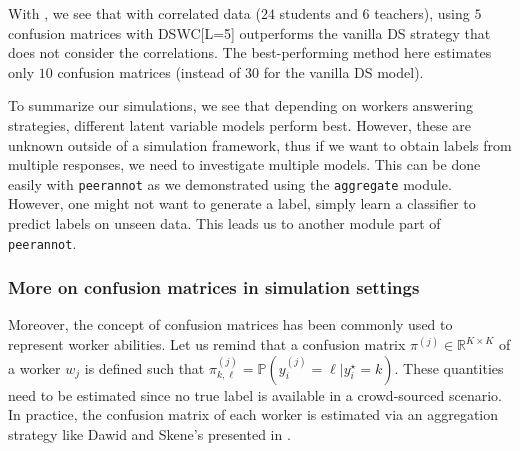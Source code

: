 With , we see that with correlated data ($24$ students and $6$ teachers), using $5$ confusion matrices with DSWC[L=5] outperforms the vanilla DS strategy that does not consider the correlations.
The best-performing method here estimates only $10$ confusion matrices (instead of $30$ for the vanilla DS model).

To summarize our simulations, we see that depending on workers answering strategies, different latent variable models perform best.
However, these are unknown outside of a simulation framework, thus if we want to obtain labels from multiple responses, we need to investigate multiple models.
This can be done easily with \texttt{peerannot} as we demonstrated using the \texttt{aggregate} module.
However, one might not want to generate a label, simply learn a classifier to predict labels on unseen data. This leads us to another module part of \texttt{peerannot}.

\subsubsection{More on confusion matrices in simulation settings}

Moreover, the concept of confusion matrices has been commonly used to represent worker abilities.
Let us remind that a confusion matrix $\pi^{(j)}\in\mathbb{R}^{K\times K}$ of a worker $w_j$ is defined such that $\pi^{(j)}_{k,\ell} = \mathbb{P}(y_i^{(j)}=\ell\vert y_i^\star=k)$.
These quantities need to be estimated since no true label is available in a crowd-sourced scenario.
In practice, the confusion matrix of each worker is estimated via an aggregation strategy like Dawid and Skene's \citep{dawid_maximum_1979} presented in .

